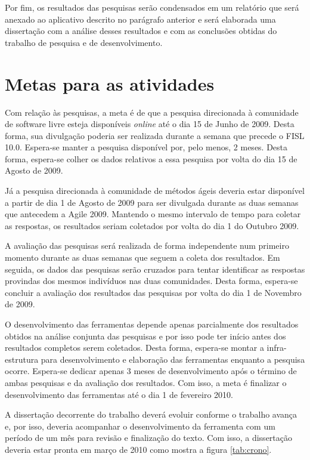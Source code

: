 Por fim, os resultados das pesquisas serão condensados em um relatório
que será anexado ao aplicativo descrito no parágrafo anterior e será
elaborada uma dissertação com a análise desses resultados e com as
conclusões obtidas do trabalho de pesquisa e de desenvolvimento.

\section{Metas para as atividades}
\label{sec:cronograma}

Com relação às pesquisas, a meta é de que a pesquisa direcionada à
comunidade de software livre esteja disponíveis \emph{online} até o
dia 15 de Junho de 2009. Desta forma, sua divulgação poderia ser
realizada durante a semana que precede o FISL 10.0. Espera-se manter a
pesquisa disponível por, pelo menos, 2 meses. Desta forma, espera-se
colher os dados relativos a essa pesquisa por volta do dia 15 de
Agosto de 2009.

Já a pesquisa direcionada à comunidade de métodos ágeis deveria estar
disponível a partir de dia 1 de Agosto de 2009 para ser divulgada
durante as duas semanas que antecedem a Agile 2009. Mantendo o mesmo
intervalo de tempo para coletar as respostas, os resultados seriam
coletados por volta do dia 1 do Outubro 2009.

A avaliação das pesquisas será realizada de forma independente num
primeiro momento durante as duas semanas que seguem a coleta dos
resultados. Em seguida, os dados das pesquisas serão cruzados para
tentar identificar as respostas provindas dos mesmos indivíduos nas
duas comunidades. Desta forma, espera-se concluir a avaliação dos
resultados das pesquisas por volta do dia 1 de Novembro de 2009.

O desenvolvimento das ferramentas depende apenas parcialmente dos
resultados obtidos na análise conjunta das pesquisas e por isso pode
ter início antes dos resultados completos serem coletados. Desta
forma, espera-se montar a infra-estrutura para desenvolvimento e
elaboração das ferramentas enquanto a pesquisa ocorre. Espera-se
dedicar apenas 3 meses de desenvolvimento após o término de ambas
pesquisas e da avaliação dos resultados. Com isso, a meta é finalizar
o desenvolvimento das ferramentas até o dia 1 de fevereiro 2010.

A dissertação decorrente do trabalho deverá evoluir conforme o
trabalho avança e, por isso, deveria acompanhar o desenvolvimento da
ferramenta com um período de um mês para revisão e finalização do
texto. Com isso, a dissertação deveria estar pronta em março de 2010
como mostra a figura \ref{tab:crono}.

